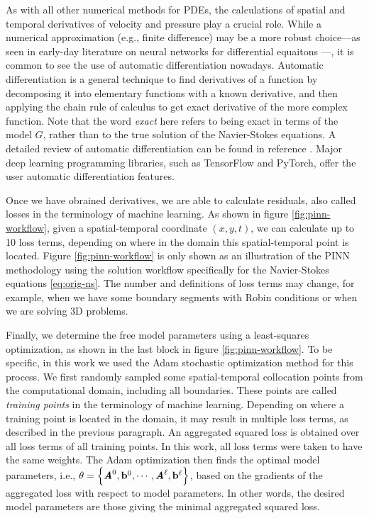 As with all other numerical methods for PDEs, the calculations of spatial and temporal derivatives of velocity and pressure play a crucial role.
While a numerical approximation (e.g., finite difference) may be a more robust choice---as seen in early-day literature on neural networks for differential equaitons \cite{dissanayake_neural-network-based_1994,lagaris_artificial_1998}---, it is common to see the use of automatic differentiation nowadays.
Automatic differentiation is a general technique to find derivatives of a function by decomposing it into elementary functions with a known derivative, and then applying the chain rule of calculus to get exact derivative of the more complex function.
Note that the word {\it exact} here refers to being exact in terms of the model $G$, rather than to the true solution of the Navier-Stokes equations. 
A detailed review of automatic differentiation can be found in reference \cite{griewank_automatic_1988}.
Major deep learning programming libraries, such as TensorFlow and PyTorch, offer the user automatic differentiation features.

Once we have obrained derivatives, we are able to calculate residuals, also called losses in the terminology of machine learning.
As shown in figure \ref{fig:pinn-workflow}, given a spatial-temporal coordinate $(x, y, t)$, we can calculate up to \num{10} loss terms, depending on where in the domain this spatial-temporal point is located. 
Figure \ref{fig:pinn-workflow} is only shown as an illustration of the PINN methodology using the solution workflow specifically for the Navier-Stokes equations \eqref{eq:orig-ns}.
The number and definitions of loss terms may change, for example, when we have some boundary segments with Robin conditions or when we are solving 3D problems.

Finally, we determine the free model parameters using a least-squares optimization, as shown in the last block in figure \ref{fig:pinn-workflow}.
To be specific, in this work we used the Adam stochastic optimization method for this process. 
We first randomly sampled some spatial-temporal collocation points from the computational domain, including all boundaries.
These points are called {\it training points} in the terminology of machine learning.
Depending on where a training point is located in the domain, it may result in multiple loss terms, as described in the previous paragraph.
An aggregated squared loss is obtained over all loss terms of all training points.
In this work, all loss terms were taken to have the same weights.
The Adam optimization then finds the optimal model parameters, i.e., $\theta=\left\{\boldsymbol{\mathit{A}}^0, \mathbf{b}^0, \cdots, \boldsymbol{\mathit{A}}^\ell, \mathbf{b}^\ell\right\}$, based on the gradients of the aggregated loss with respect to model parameters.
In other words, the desired model parameters are those giving the minimal aggregated squared loss.

